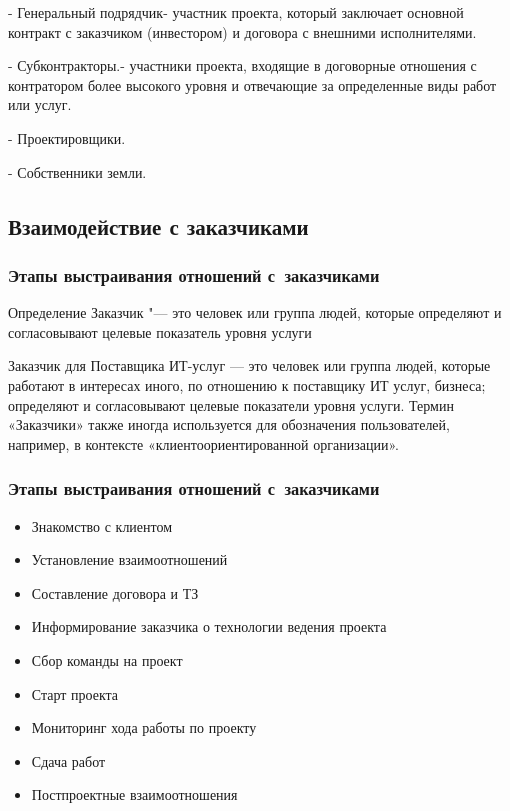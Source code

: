 \documentclass{../industrial-development}
\begin{document}
- Генеральный подрядчик- участник проекта, который заключает основной контракт с заказчиком (инвестором) и договора с внешними исполнителями.

- Субконтракторы.- участники проекта, входящие в договорные отношения с контратором более высокого уровня и отвечающие за определенные виды работ или услуг.

- Проектировщики.

- Собственники земли.

\subsection{Взаимодействие с заказчиками}
\begin{frame} \frametitle{Этапы выстраивания отношений с~заказчиками}
	\begin{block}{Определение}
		\alert{Заказчик} "--- это человек или группа людей, которые определяют и согласовывают целевые показатель уровня услуги
	\end{block}
\end{frame}
	
\lecturenotes
Заказчик для Поставщика ИТ-услуг — это человек или группа людей, которые работают в интересах иного, по отношению к поставщику ИТ услуг, бизнеса; определяют и согласовывают целевые показатели уровня услуги. Термин «Заказчики» также иногда используется для обозначения пользователей, например, в контексте «клиентоориентированной организации».


\begin{frame} \frametitle{Этапы выстраивания отношений с~заказчиками}

	\begin{itemize}
		\item Знакомство с клиентом
		\item Установление взаимоотношений
		\item Составление договора и ТЗ
		\item Информирование заказчика о технологии ведения проекта
		\item Сбор команды на проект 
		\item Старт проекта 
		\item Мониторинг хода работы по проекту
		\item Сдача работ
		\item Постпроектные взаимоотношения
	\end{itemize}
\end{frame}
\end{document}
